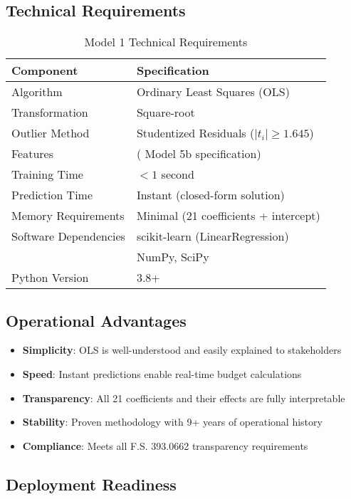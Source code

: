\subsection{Technical Requirements}

\begin{table}[ht]
\centering
\caption{Model 1 Technical Requirements}
\begin{tabular}{ll}
\toprule
\textbf{Component} & \textbf{Specification} \\
\midrule
Algorithm & Ordinary Least Squares (OLS) \\
Transformation & Square-root \\
Outlier Method & Studentized Residuals ($|t_i| \geq 1.645$) \\
Features & \ModelOneNumFeatures{} ( Model 5b specification) \\
Training Time & $< 1$ second \\
Prediction Time & Instant (closed-form solution) \\
Memory Requirements & Minimal (21 coefficients + intercept) \\
\midrule
Software Dependencies & scikit-learn (LinearRegression) \\
& NumPy, SciPy \\
Python Version & 3.8+ \\
\bottomrule
\end{tabular}
\end{table}

\subsection{Operational Advantages}

\begin{itemize}
    \item \textbf{Simplicity}: OLS is well-understood and easily explained to stakeholders
    \item \textbf{Speed}: Instant predictions enable real-time budget calculations
    \item \textbf{Transparency}: All 21 coefficients and their effects are fully interpretable
    \item \textbf{Stability}: Proven methodology with 9+ years of operational history
    \item \textbf{Compliance}: Meets all F.S. 393.0662 transparency requirements
\end{itemize}

\subsection{Deployment Readiness}

